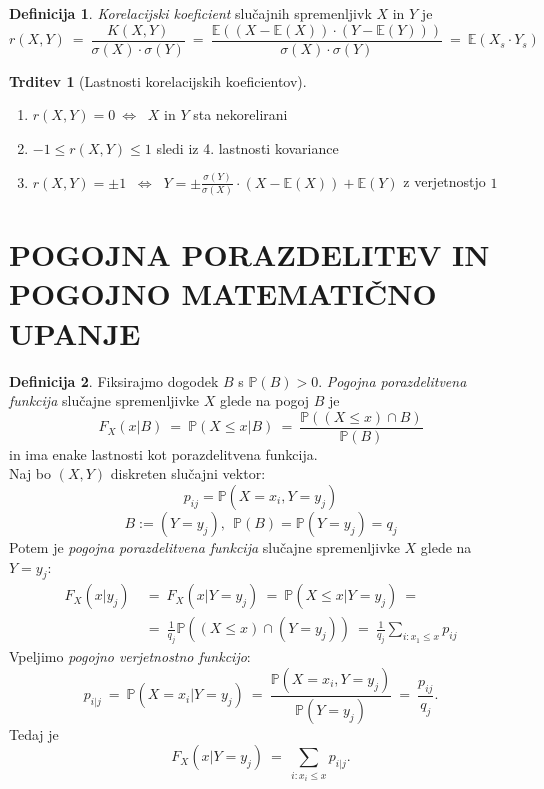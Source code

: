 \documentclass[11pt]{article}
\theoremstyle{definition}
\newtheorem{definicija}{Definicija}[section]
\theoremstyle{definition}
\newtheorem{trditev}{Trditev}[section]
\theoremstyle{definition}
\begin{document}
\begin{definicija}

\textit{Korelacijski koeficient} slučajnih spremenljivk $X$ in $Y$ je
$$r(X,Y) ~=~ \frac{K(X, Y)}{\sigma(X) \cdot \sigma(Y)} ~=~ \frac{\mathbb{E}((X - \mathbb{E}(X)) \cdot (Y - \mathbb{E}(Y)))}{\sigma(X) \cdot \sigma(Y)} ~=~ \mathbb{E}(X_s \cdot Y_s)$$

\end{definicija}
\vspace{0.5cm}

\begin{trditev}[Lastnosti korelacijskih koeficientov]
~\\
\begin{enumerate}
	\item $r(X,Y) = 0 ~\iff~$ $X$ in $Y$ sta nekorelirani
	\item $-1 \leq r(X,Y) \leq 1$ sledi iz 4. lastnosti kovariance
	\item $r(X,Y) = \pm 1$ $~\iff~$ $Y = \pm \frac{\sigma(Y)}{\sigma(X)} \cdot (X - \mathbb{E}(X)) + \mathbb{E}(Y)$ z verjetnostjo $1$
\end{enumerate}
\end{trditev}
\vspace{0.5cm}

\pagebreak


\section{POGOJNA PORAZDELITEV IN POGOJNO MATEMATIČNO UPANJE}
\vspace{0.5cm}

\begin{definicija}

Fiksirajmo dogodek $B$ s $\mathbb{P}(B) > 0$. \textit{Pogojna porazdelitvena funkcija} slučajne spremenljivke $X$ glede na pogoj $B$ je
$$F_X(x | B) ~=~ \mathbb{P}(X \leq x | B) ~=~ \frac{\mathbb{P}((X \leq x) \cap B)}{\mathbb{P}(B)}$$
in ima enake lastnosti kot porazdelitvena funkcija. \\

\noindent Naj bo $(X, Y)$ diskreten slučajni vektor: 
$$p_{ij} =  \mathbb{P}(X = x_i, Y = y_j)$$
$$B := (Y = y_j), ~~\mathbb{P}(B) = \mathbb{P}(Y = y_j) = q_j$$
Potem je \textit{pogojna porazdelitvena funkcija} slučajne spremenljivke $X$ glede na $Y = y_j$:
\begin{align*}
	F_X(x | y_j) ~&=~ F_X(x | Y = y_j) ~=~ \mathbb{P}(X \leq x |Y = y_j) ~= \\
	&=~ \frac{1}{q_j} \mathbb{P}((X \leq x) \cap (Y = y_j)) ~=~ \frac{1}{q_j} \sum_{i: x_1 \leq x} p_{ij}
\end{align*}
Vpeljimo  \textit{pogojno verjetnostno funkcijo}:
$$p_{i|j} ~=~ \mathbb{P}(X = x_i | Y = y_j) ~=~ \frac{\mathbb{P}(X = x_i, Y = y_j)}{\mathbb{P}(Y = y_j)} ~=~ \frac{p_{ij}}{q_j}.$$
Tedaj je 
$$F_X(x | Y = y_j) ~=~ \sum_{i: x_i \leq x} p_{i|j}.$$

\end{definicija}
\vspace{0.5cm}
\end{document}

